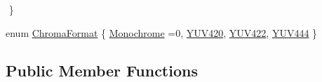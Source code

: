 \begin{DoxyCompactItemize}
$$ \}
\item 
enum \hyperlink{classcv_1_1gpu_1_1VideoReader__GPU_a7fc7968ff0961cdaa050b3845799b440}{Chroma\-Format} \{ \hyperlink{classcv_1_1gpu_1_1VideoReader__GPU_a7fc7968ff0961cdaa050b3845799b440a30354dcfc16f690550d4e32269586d4c}{Monochrome} =0, 
\hyperlink{classcv_1_1gpu_1_1VideoReader__GPU_a7fc7968ff0961cdaa050b3845799b440ad1f70221be9016063f04d6183d1910a3}{Y\-U\-V420}, 
\hyperlink{classcv_1_1gpu_1_1VideoReader__GPU_a7fc7968ff0961cdaa050b3845799b440a30cf7a5de82ef63bf4dc002d0358e31f}{Y\-U\-V422}, 
\hyperlink{classcv_1_1gpu_1_1VideoReader__GPU_a7fc7968ff0961cdaa050b3845799b440a9eeb367fe3c3602193200c588d973623}{Y\-U\-V444}
 \}
\end{DoxyCompactItemize}
\subsection*{Public Member Functions}
